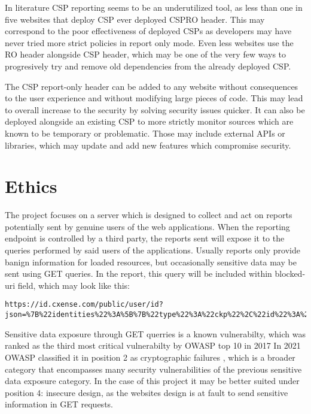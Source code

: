 In literature CSP reporting seems to be an underutilized tool, as less than one in five websites that deploy CSP ever deployed CSPRO header. \cite{osti_10173479}
This may correspond to the poor effectiveness of deployed CSPs as developers may have never tried more strict policies in report only mode.
Even less websites use the RO header alongside CSP header, which may be one of the very few ways to progresively try and remove old dependencies from the already deployed CSP.

The CSP report-only header can be added to any website without consequences to the user experience and without modifying large pieces of code.
This may lead to overall increase to the security by solving security issues quicker.
It can also be deployed alongside an existing CSP to more strictly monitor sources which are known to be temporary or problematic.
Those may include external APIs or libraries, which may update and add new features which compromise security.


\section{Ethics}
The project focuses on a server which is designed to collect and act on reports potentially sent by genuine users of the web applications. 
When the reporting endpoint is controlled by a third party, the reports sent will expose it to the queries performed by said users of the applications.
Usually reports only provide banign information for loaded resources, but occasionally sensitive data may be sent using GET queries.
In the report, this query will be included within blocked-uri field, which may look like this:
\begin{verbatim}
https://id.cxense.com/public/user/id?json=%7B%22identities%22%3A%5B%7B%22type%22%3A%22ckp%22%2C%22id%22%3A%22lm9kdx9144wtgfya%22%7D%2C%7B%22type%22%3A%22cst%22%2C%22id%22%3A%223dmijrrz7kkn62ie7ib1yw5z6l%22%7D%5D%2C%22siteId%22%3A%221136227972865927410%22%2C%22location%22%3A%22https%3A%2F%2Fwww.libertatea.ro%2F%22%7D&callback=cXJsonpCB2
\end{verbatim}
Sensitive data exposure through GET querries is a known vulnerabilty, which was ranked as the third most critical vulnerabilty by OWASP top 10 in 2017 \cite{owaspTop102017}
In 2021 OWASP classified it in position 2 as cryptographic failures \cite{owaspTop10}, which is a broader category that encompasses many security vulnerabilities of the previous sensitive data exposure category. 
In the case of this project it may be better suited under position 4: insecure design, as the websites design is at fault to send sensitive information in GET requests. 

